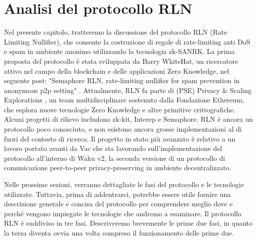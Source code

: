 \chapter{Analisi del protocollo RLN}
\label{chap:rln-protocol}

Nel presente capitolo, tratteremo la discussione del protocollo RLN (Rate Limiting Nullifier), che consente la
costruzione di regole di rate-limiting anti DoS e spam in ambiente anonimo utilizzando la tecnologia zk-SANRK. La prima proposta del protocollo è stata
sviluppata da Barry WhiteHat, un ricercatore attivo nel campo della blockchain e delle applicazioni Zero Knowledge, nel
seguente post: "Semaphore RLN, rate-limiting nullifier for spam prevention in anonymous p2p setting" \cite{semaphore-rln}. Attualmente, RLN
fa parte di (PSE) Privacy \& Scaling Explorations \cite{pse}, un team multidisciplinare sostenuto dalla Fondazione Ethereum, che
esplora nuove tecnologie Zero Knowledge e altre primitive crittografiche. Alcuni progetti di rilievo includono zk-kit,
Interep e Semaphore. RLN è ancora un protocollo poco conosciuto, e non esistono ancora grosse implementazioni al di
fuori del contesto di ricerca. Il progetto in stato più avanzato è relativo a un lavoro portato avanti da Vac che sta
lavorando sull'implementazione del protocollo all'interno di Waku v2, la seconda versione di un protocollo di
comunicazione peer-to-peer privacy-preserving in ambiente decentralizzato.

Nelle prossime sezioni, verranno dettagliate le fasi del protocollo e le tecnologie utilizzate. Tuttavia, prima di
addentrarci, potrebbe essere utile fornire una descrizione generale e concisa del protocollo per comprendere meglio dove
e perché vengono impiegate le tecnologie che andremo a esaminare. Il protocollo RLN è suddiviso in tre fasi. Descriveremo brevemente le prime due fasi, in quanto la terza diventa ovvia una volta compreso il funzionamento delle prime due.

